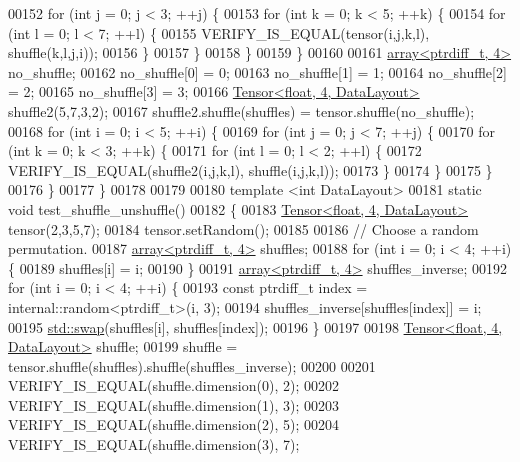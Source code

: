 \begin{DoxyCode}
00152     \textcolor{keywordflow}{for} (\textcolor{keywordtype}{int} j = 0; j < 3; ++j) \{
00153       \textcolor{keywordflow}{for} (\textcolor{keywordtype}{int} k = 0; k < 5; ++k) \{
00154         \textcolor{keywordflow}{for} (\textcolor{keywordtype}{int} l = 0; l < 7; ++l) \{
00155           VERIFY\_IS\_EQUAL(tensor(i,j,k,l), shuffle(k,l,j,i));
00156         \}
00157       \}
00158     \}
00159   \}
00160 
00161   \hyperlink{class_eigen_1_1array}{array<ptrdiff\_t, 4>} no\_shuffle;
00162   no\_shuffle[0] = 0;
00163   no\_shuffle[1] = 1;
00164   no\_shuffle[2] = 2;
00165   no\_shuffle[3] = 3;
00166   \hyperlink{class_eigen_1_1_tensor}{Tensor<float, 4, DataLayout>} shuffle2(5,7,3,2);
00167   shuffle2.shuffle(shuffles) = tensor.shuffle(no\_shuffle);
00168   \textcolor{keywordflow}{for} (\textcolor{keywordtype}{int} i = 0; i < 5; ++i) \{
00169     \textcolor{keywordflow}{for} (\textcolor{keywordtype}{int} j = 0; j < 7; ++j) \{
00170       \textcolor{keywordflow}{for} (\textcolor{keywordtype}{int} k = 0; k < 3; ++k) \{
00171         \textcolor{keywordflow}{for} (\textcolor{keywordtype}{int} l = 0; l < 2; ++l) \{
00172           VERIFY\_IS\_EQUAL(shuffle2(i,j,k,l), shuffle(i,j,k,l));
00173         \}
00174       \}
00175     \}
00176   \}
00177 \}
00178 
00179 
00180 \textcolor{keyword}{template} <\textcolor{keywordtype}{int} DataLayout>
00181 \textcolor{keyword}{static} \textcolor{keywordtype}{void} test\_shuffle\_unshuffle()
00182 \{
00183   \hyperlink{class_eigen_1_1_tensor}{Tensor<float, 4, DataLayout>} tensor(2,3,5,7);
00184   tensor.setRandom();
00185 
00186   \textcolor{comment}{// Choose a random permutation.}
00187   \hyperlink{class_eigen_1_1array}{array<ptrdiff\_t, 4>} shuffles;
00188   \textcolor{keywordflow}{for} (\textcolor{keywordtype}{int} i = 0; i < 4; ++i) \{
00189     shuffles[i] = i;
00190   \}
00191   \hyperlink{class_eigen_1_1array}{array<ptrdiff\_t, 4>} shuffles\_inverse;
00192   \textcolor{keywordflow}{for} (\textcolor{keywordtype}{int} i = 0; i < 4; ++i) \{
00193     \textcolor{keyword}{const} ptrdiff\_t index = internal::random<ptrdiff\_t>(i, 3);
00194     shuffles\_inverse[shuffles[index]] = i;
00195     \hyperlink{endian_8c_a3ca5ecd34b04d6a243c054ac3a57f68d}{std::swap}(shuffles[i], shuffles[index]);
00196   \}
00197 
00198   \hyperlink{class_eigen_1_1_tensor}{Tensor<float, 4, DataLayout>} shuffle;
00199   shuffle = tensor.shuffle(shuffles).shuffle(shuffles\_inverse);
00200 
00201   VERIFY\_IS\_EQUAL(shuffle.dimension(0), 2);
00202   VERIFY\_IS\_EQUAL(shuffle.dimension(1), 3);
00203   VERIFY\_IS\_EQUAL(shuffle.dimension(2), 5);
00204   VERIFY\_IS\_EQUAL(shuffle.dimension(3), 7);

\end{DoxyCode}
